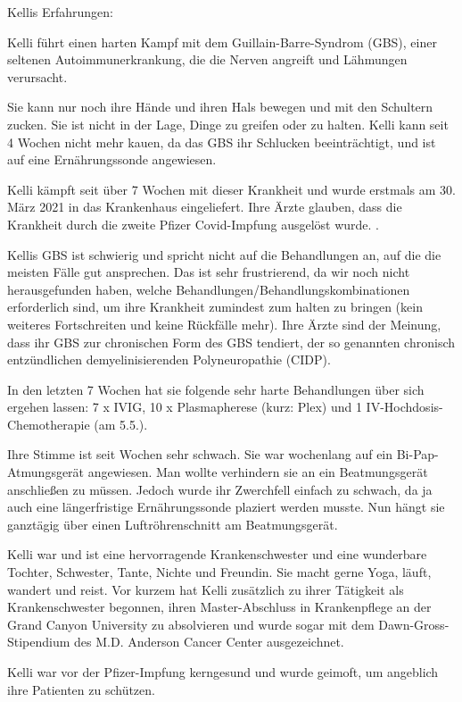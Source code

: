 Kellis Erfahrungen:

Kelli führt einen harten Kampf mit dem Guillain-Barre-Syndrom (GBS), einer
seltenen Autoimmunerkrankung, die die Nerven angreift und Lähmungen verursacht.

Sie kann nur noch ihre Hände und ihren Hals bewegen und mit den Schultern
zucken. Sie ist nicht in der Lage, Dinge zu greifen oder zu halten. Kelli kann
seit 4 Wochen nicht mehr kauen, da das GBS ihr Schlucken beeinträchtigt, und ist
auf eine Ernährungssonde angewiesen.

Kelli kämpft seit über 7 Wochen mit dieser Krankheit und wurde erstmals am
30. März 2021 in das Krankenhaus eingeliefert. Ihre Ärzte glauben, dass die
Krankheit durch die zweite Pfizer Covid-Impfung ausgelöst wurde. .

Kellis GBS ist schwierig und spricht nicht auf die Behandlungen an, auf die die
meisten Fälle gut ansprechen. Das ist sehr frustrierend, da wir noch nicht
herausgefunden haben, welche Behandlungen/Behandlungskombinationen erforderlich
sind, um ihre Krankheit zumindest zum halten zu bringen (kein weiteres
Fortschreiten und keine Rückfälle mehr). Ihre Ärzte sind der Meinung, dass ihr
GBS zur chronischen Form des GBS tendiert, der so genannten chronisch
entzündlichen demyelinisierenden Polyneuropathie (CIDP).

In den letzten 7 Wochen hat sie folgende sehr harte Behandlungen über sich
ergehen lassen: 7 x IVIG, 10 x Plasmapherese (kurz: Plex) und 1
IV-Hochdosis-Chemotherapie (am 5.5.).

Ihre Stimme ist seit Wochen sehr schwach. Sie war wochenlang auf ein
Bi-Pap-Atmungsgerät angewiesen. Man wollte verhindern sie an ein Beatmungsgerät
anschließen zu müssen. Jedoch wurde ihr Zwerchfell einfach zu schwach, da ja
auch eine längerfristige Ernährungssonde plaziert werden musste. Nun hängt sie
ganztägig über einen Luftröhrenschnitt am Beatmungsgerät.

Kelli war und ist eine hervorragende Krankenschwester und eine wunderbare
Tochter, Schwester, Tante, Nichte und Freundin. Sie macht gerne Yoga, läuft,
wandert und reist. Vor kurzem hat Kelli zusätzlich zu ihrer Tätigkeit als
Krankenschwester begonnen, ihren Master-Abschluss in Krankenpflege an der Grand
Canyon University zu absolvieren und wurde sogar mit dem Dawn-Gross-Stipendium
des M.D. Anderson Cancer Center ausgezeichnet.

Kelli war vor der Pfizer-Impfung kerngesund und wurde geimoft, um angeblich ihre
Patienten zu schützen.
